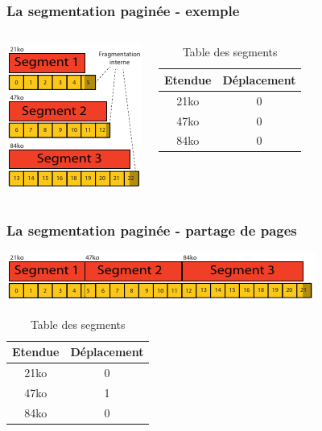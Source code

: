 \begin{frame}
\frametitle{La segmentation paginée - exemple}
\begin{columns}
\includegraphics[height=0.8\textheight]{../illustration/memoire_segment_paginee_exemple.pdf}
\begin{table}[htdp]
\caption{Table des segments}
\begin{center}
\begin{tabular}{c|c}
Etendue & Déplacement \\
\hline
21ko & 0 \\ 
47ko & 0 \\
84ko & 0 \\
\end{tabular}
\end{center}
\end{table}
\end{columns}
\end{frame}

\begin{frame}
\frametitle{La segmentation paginée - partage de pages}
\includegraphics[width=\textwidth]{../illustration/memoire_segment_paginee_exemple_partage.pdf}

\begin{table}[htdp]
\caption{Table des segments}
\begin{center}
\begin{tabular}{c|c}
Etendue & Déplacement \\
\hline
21ko & 0 \\ 
47ko & 1 \\
84ko & 0 \\
\end{tabular}
\end{center}
\end{table}
\end{frame}

